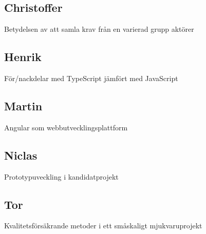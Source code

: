 \subsection{Christoffer}
Betydelsen av att samla krav från en varierad grupp aktörer
\subsection{Henrik}
För/nackdelar med TypeScript jämfört med JavaScript
\subsection{Martin}
Angular som webbutvecklingsplattform
\subsection{Niclas}
Prototypuveckling i kandidatprojekt
\subsection{Tor}
Kvalitetsförsäkrande metoder i ett småskaligt mjukvaruprojekt
